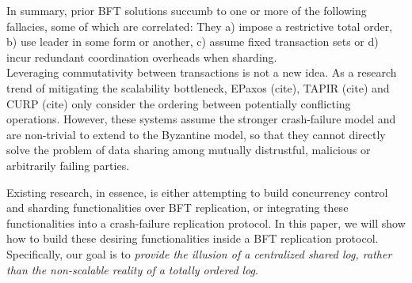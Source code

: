 In summary, prior BFT solutions succumb to one or more of the following fallacies, some of which are correlated: They a) impose a restrictive total order, b) use leader in some form or another, c) assume fixed transaction sets or d) incur redundant coordination overheads when sharding. \\

Leveraging commutativity between transactions is not a new idea. As a research trend of mitigating the scalability bottleneck, EPaxos (cite), TAPIR (cite) and CURP (cite) only consider the ordering between potentially conflicting operations. However, these systems assume the stronger crash-failure model and are non-trivial to extend to the Byzantine model, so that they cannot directly solve the problem of data sharing among mutually distrustful, malicious or arbitrarily failing parties.
\fi

Existing research, in essence, is either attempting to build concurrency control and sharding functionalities over BFT replication, or integrating these functionalities into a crash-failure replication protocol. In this paper, we will show how to build these desiring functionalities inside a BFT replication protocol. Specifically, our goal is to \textit{provide the illusion of a centralized shared log, rather than the non-scalable reality of a totally ordered log}.\\

\iffalse
\fs{rambling too long}
\fs{CUT FROM HERE}

While copious efforts exist to design decentralized systems that exploit transaction semantics for the crash failure model, few, if any attempts have been made for the Byzantine Fault Model. This naturally raises the question, why so? One explanation is that in Byzantine Systems, some centralization is in fact highly desirable as it simplifies the problem by identifying a single point of accountability. A natural way to improve both scalability and fairness is to avoid this bottleneck, at the cost of paving the path for a wider set of undesirable phenomena. The challenge of a leaderless byzantine system is simple yet daunting: It empowers both malicious users and system components to collude and misbehave in potentially unaccountable ways.
In this paper we will show to overcome this challenge by designing and implementing the leaderless BFT system Indicus that avoids near-all centralization while replicating interactive ACID transactions in a partial order. 
\fs{client driven protocol could be seen as nightmare for byz system. What is our design agenda to control this? -> Byz can only influence itself. Honest users can keep using the system }\\
\fs{CUT TILL HERE}
\fi

